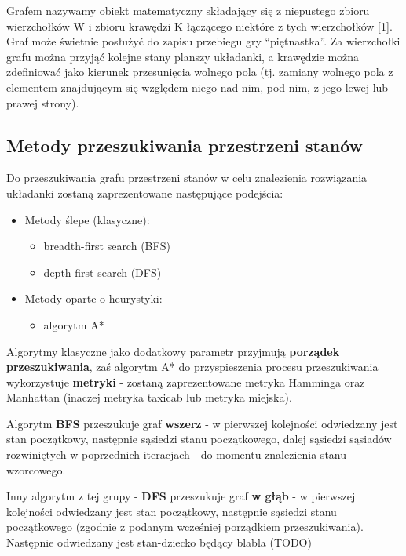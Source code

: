\documentclass{classrep}
\begin{document}
Grafem nazywamy obiekt matematyczny składający się z niepustego zbioru
wierzchołków W i zbioru krawędzi K łączącego niektóre z tych
wierzchołków {[}1{]}. Graf może świetnie posłużyć do zapisu przebiegu
gry ``piętnastka''. Za wierzchołki grafu można przyjąć kolejne stany
planszy układanki, a krawędzie można zdefiniować jako kierunek
przesunięcia wolnego pola (tj. zamiany wolnego pola z elementem
znajdującym się względem niego nad nim, pod nim, z jego lewej lub prawej
strony).

\subsection{Metody przeszukiwania przestrzeni stanów}

Do przeszukiwania grafu przestrzeni stanów w celu znalezienia
rozwiązania układanki zostaną zaprezentowane następujące podejścia:

\begin{itemize}
\item
  Metody ślepe (klasyczne):

  \begin{itemize}
  \item
    breadth-first search (BFS)
  \item
    depth-first search (DFS)
  \end{itemize}
\item
  Metody oparte o heurystyki:

  \begin{itemize}
  \item
    algorytm A*
  \end{itemize}
\end{itemize}

Algorytmy klasyczne jako dodatkowy parametr przyjmują \textbf{porządek
przeszukiwania}, zaś algorytm A* do przyspieszenia procesu
przeszukiwania wykorzystuje \textbf{metryki} - zostaną zaprezentowane
metryka Hamminga oraz Manhattan (inaczej metryka taxicab lub metryka
miejska).

Algorytm \textbf{BFS} przeszukuje graf \textbf{wszerz} - w pierwszej
kolejności odwiedzany jest stan początkowy, następnie sąsiedzi stanu
początkowego, dalej sąsiedzi sąsiadów rozwiniętych w poprzednich
iteracjach - do momentu znalezienia stanu wzorcowego.

Inny algorytm z tej grupy - \textbf{DFS} przeszukuje graf \textbf{w
głąb} - w pierwszej kolejności odwiedzany jest stan początkowy,
następnie sąsiedzi stanu początkowego (zgodnie z podanym wcześniej
porządkiem przeszukiwania). Następnie odwiedzany jest stan-dziecko
będący blabla (TODO)
\end{document}
